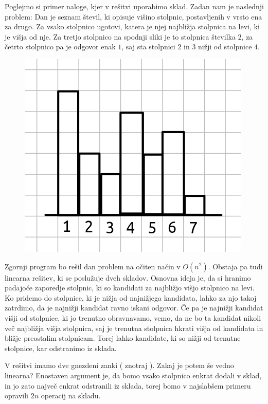 Poglejmo si primer naloge, kjer v rešitvi uporabimo sklad.
Zadan nam je naslednji problem:
Dan je seznam števil, ki opisuje višino stolpnic, postavljenih v vrsto ena za
drugo.
Za vsako stolpnico ugotovi, katera je njej najbližja stolpnica na levi, ki je
višja od nje.
Za tretjo stolpnico na spodnji sliki je to stolpnica številka $2$, za četrto
stolpnico pa je odgovor enak $1$, saj sta stolpnici $2$ in $3$ nižji od
stolpnice $4$.

\begin{figure}[h!]
  \centering
  \includegraphics[width=0.5\linewidth]{poglavja/podatkovne-strukture/stolpnice}
\end{figure}


Zgornji program bo rešil dan problem na očiten način v $O(n^2)$.
Obstaja pa tudi linearna rešitev, ki se poslužuje dveh skladov.
Osnovna ideja je, da si hranimo padajoče zaporedje stolpnic, ki so kandidati za
najbližjo višjo stolpnico na levi.
Ko pridemo do stolpnice, ki je nižja od najnižjega kandidata, lahko za njo takoj
zatrdimo, da je najnižji kandidat ravno iskani odgovor.
Če pa je najnižji kandidat višji od stolpnice, ki jo trenutno obravnavamo, vemo,
da ne bo ta kandidat nikoli več najbližja višja stolpnica, saj je trenutna
stolpnica hkrati višja od kandidata in bližje preostalim stolpnicam.
Torej lahko kandidate, ki so nižji od trenutne stolpnice, kar odstranimo iz
sklada.

V rešitvi imamo dve gnezdeni zanki ( znotraj ).
Zakaj je potem še vedno linearna?
Enostaven argument je, da bomo vsako stolpnico enkrat dodali v sklad, in jo
zato največ enkrat odstranili iz sklada, torej bomo v najslabšem primeru
opravili $2n$ operacij na skladu.





